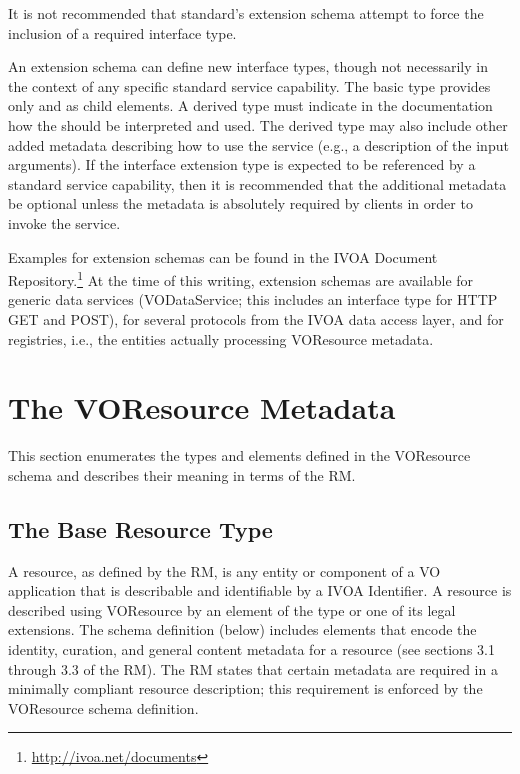 \documentclass[11pt,a4paper]{ivoa}
\begin{document}
It is not recommended that standard's extension schema attempt to
force the inclusion of a required interface type.  



An extension schema can define new interface types, though not
necessarily in the context of any specific standard service
capability.  The basic  type provides only
 and  as child
elements.  A derived  type must indicate in
the documentation how the  should be
interpreted and used.  The derived type may also include other added
metadata describing how to use the service (e.g., a description of the
input arguments).  If the interface extension type is expected to be
referenced by a standard service capability, then it is recommended
that the additional metadata be optional unless the metadata is
absolutely required by clients in order to invoke the service.


Examples for extension schemas can be found in the IVOA Document
Repository.\footnote{\url{http://ivoa.net/documents}}  At the time of
this writing, extension schemas are available for generic data services
(VODataService; this includes an interface type for HTTP GET and POST),
for several protocols from the IVOA data access layer, and for
registries, i.e., the entities actually processing VOResource metadata.


\section{The VOResource Metadata}
\label{sect:metadata}


This section enumerates the types and elements defined in the
VOResource schema and describes their meaning in terms of the
RM.


\subsection{The Base Resource Type}

\label{sect:restype}

A resource, as defined by the RM, is any entity or component of a VO
application that is describable and identifiable by a IVOA Identifier.
A resource is described using VOResource by an element of the type
 or one of its legal extensions.  The schema
definition (below) includes elements that encode the identity, curation,
and general content metadata for a resource (see sections 3.1 through
3.3 of the RM).  The RM states that certain metadata are required in a
minimally compliant resource description; this requirement is enforced
by the VOResource schema definition.  
\end{document}

